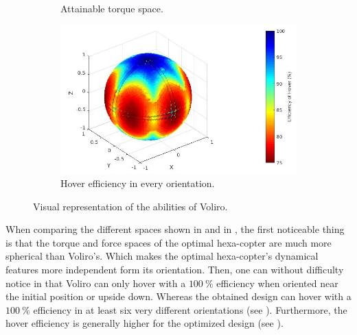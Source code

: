 {\begin{figure}[!ht]
{\begin{subfigure}[b]{0.5\textwidth}
    \caption{Attainable torque space.} \label{fig:voliro_tspace}
  \end{subfigure}
  \begin{subfigure}[b]{0.52\textwidth}
    \includegraphics[width=\linewidth]{images/Voliro_hspace.jpg}
    \caption{Hover efficiency in every orientation.} \label{fig:voliro_hspace}
  \end{subfigure}}
  \caption{Visual representation of the abilities of Voliro.}
  \label{fig:Voliro_spaces}
\end{figure}

When comparing the different spaces shown in 
and in , the first noticeable thing is that the torque
and force spaces of the optimal hexa-copter are much more spherical than
Voliro’s. Which makes the optimal hexa-copter’s dynamical features more
independent form its orientation. Then, one can without difficulty notice in
 that Voliro can only hover with a $100\ \%$ efficiency
when oriented near the initial position or upside down. Whereas the obtained
design can hover with a $100\ \%$ efficiency in at least six very different orientations
(see ). Furthermore, the hover efficiency is generally
higher for the optimized design (see ).

\begin{table}[!ht]
\begin{center}
 \caption{Information on the designs’ force space properties.}\vspace{1ex}
 \label{tab:tab_Hexa_compare_force}
\end{center}
\end{table}

}
